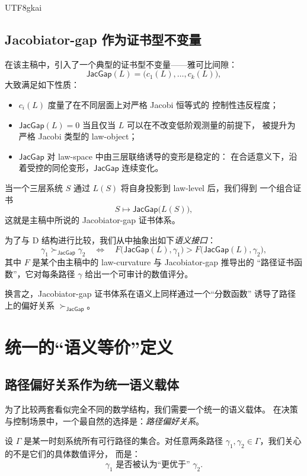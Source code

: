 \documentclass[12pt]{article}
\newcommand{\JacGap}{\mathsf{JacGap}}
\begin{document}
\begin{CJK*}{UTF8}{gkai}
\subsection{Jacobiator-gap 作为证书型不变量}

在该主稿中，引入了一个典型的证书型不变量——雅可比间隙：
\[
  \JacGap(L)
  =
  \bigl(c_1(L),\dots,c_k(L)\bigr),
\]
大致满足如下性质：
\begin{itemize}
  \item $c_i(L)$ 度量了在不同层面上对严格 Jacobi 恒等式的
        控制性违反程度；
  \item $\JacGap(L)=0$ 当且仅当 $L$ 可以在不改变低阶观测量的前提下，
        被提升为严格 Jacobi 类型的 law-object；
  \item $\JacGap$ 对 law-space 中由三层联络诱导的变形是稳定的：
        在合适意义下，沿着受控的同伦变形，$\JacGap$ 连续变化。
\end{itemize}

当一个三层系统 $S$ 通过 $L(S)$ 将自身投影到 law-level 后，我们得到
一个组合证书
\[
  S \longmapsto \JacGap\bigl(L(S)\bigr),
\]
这就是主稿中所说的 Jacobiator-gap 证书体系。

为了与 D 结构进行比较，我们从中抽象出如下\emph{语义接口}：
\begin{equation}
  \gamma_1
  \succ_{\JacGap}
  \gamma_2
  \quad\Longleftrightarrow\quad
  F\bigl(\JacGap(L),\gamma_1\bigr)
  >
  F\bigl(\JacGap(L),\gamma_2\bigr),
  \label{eq:Jac-order}
\end{equation}
其中 $F$ 是某个由主稿中的 law-curvature 与 Jacobiator-gap 推导出的
“路径证书函数”，它对每条路径 $\gamma$ 给出一个可审计的数值评分。

换言之，Jacobiator-gap 证书体系在语义上同样通过一个“分数函数”
诱导了路径上的偏好关系 $\succ_{\JacGap}$。

\section{统一的“语义等价”定义}

\subsection{路径偏好关系作为统一语义载体}

为了比较两套看似完全不同的数学结构，我们需要一个统一的语义载体。
在决策与控制场景中，一个最自然的选择是：\emph{路径偏好关系}。

设 $\Gamma$ 是某一时刻系统所有可行路径的集合。对任意两条路径
$\gamma_1,\gamma_2\in\Gamma$，我们关心的不是它们的具体数值评分，
而是：
\[
  \gamma_1 \text{ 是否被认为“更优于” } \gamma_2.
\]


\end{CJK*}
\end{document}
